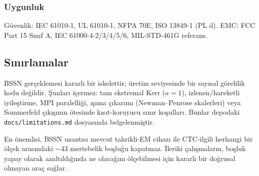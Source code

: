 \subsubsection{Uygunluk}

Güvenlik: IEC 61010-1, UL 61010-1, NFPA 70E, ISO 13849-1 (PL d). EMC: FCC Part 15 Sınıf A, IEC 61000-4-2/3/4/5/6, MIL-STD-461G referans.

\subsection{Sınırlamalar}

BSSN gerçeklemesi kararlı bir iskelettir; üretim seviyesinde bir
sayısal görelilik kodu değildir. Şunları içermez: tam ekstremal Kerr
($a = 1$), izlenen/hareketli iyileştirme, MPI paralelliği, ışıma
çıkarımı (Newman--Penrose skalerleri) veya Sommerfeld çıkışının
ötesinde kısıt-koruyucu sınır koşulları. Bunlar depodaki
\texttt{docs/limitations.md} dosyasında belgelenmiştir.

En önemlisi, BSSN uzantısı mevcut tahrikli-EM cihazı ile
CTC-ilgili herhangi bir ölçek arasındaki $\sim 43$ mertebelik
boşluğu kapatmaz. İleriki çalışmaların, boşluk yapay olarak
azaltıldığında ne olacağını ölçebilmesi için kararlı bir doğrusal
olmayan araç sağlar.

